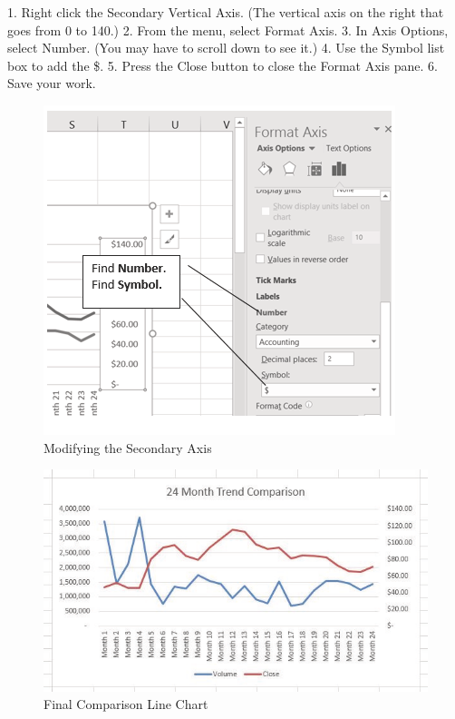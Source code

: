 1.   Right click the Secondary Vertical Axis. (The vertical axis on the right that goes from 0 to 140.)
2.   From the menu, select Format Axis.
3.   In Axis Options, select Number. (You may have to scroll down to see it.)
4.   Use the Symbol list box to add the \$.
5.   Press the Close button to close the Format Axis pane.
6.   Save your work.



\begin{figure}[H]
	\centering
	\includegraphics[width=\maxwidth{.95\linewidth}]{gfx/ch04_fig09}
	\caption{Modifying the Secondary Axis}
	\label{04:fig09}
\end{figure}





\begin{figure}[H]
	\centering
	\includegraphics[width=\maxwidth{.95\linewidth}]{gfx/ch04_fig10}
	\caption{Final Comparison Line Chart}
	\label{04:fig10}
\end{figure}





